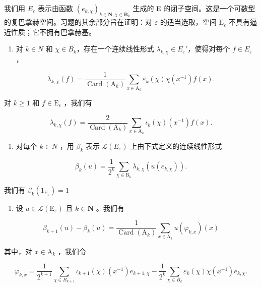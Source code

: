 我们用 \(E_{\varepsilon}\) 表示由函数 \((e_{k,\chi})_{k\in\mathbf{N},\chi\in\mathbf{B}_{k}}\) 生成的 E 的闭子空间。这是一个可数型的复巴拿赫空间。习题的其余部分旨在证明：对 \(\varepsilon\) 的适当选取，空间 \(\mathrm{E}_{\varepsilon}\) 不具有逼近性质；它不拥有巴拿赫基。

\begin{enumerate}
\def\labelenumi{\alph{enumi})}
\setcounter{enumi}{2}
\tightlist
\item
  对 \(k \in N\) 和 \(\chi \in B_{k}\)，存在一个连续线性形式 \(\lambda_{k,\chi} \in E_{\varepsilon}'\)，使得对每个 \(f \in E_{\varepsilon}\)，
\end{enumerate}

\[
\lambda_ {k, \chi} (f) = \frac {1}{\operatorname{Card} (\mathrm{A} _ {k})} \sum_ {x \in \mathrm{A} _ {k}} \varepsilon_ {k} (\chi) \chi (x ^ {- 1}) f (x).
\]

对 \(k \geqslant 1\) 和 \(f \in \mathrm{E}_{\varepsilon}\) ，我们有

\[
\lambda_ {k, \chi} (f) = \frac {2}{\operatorname{Card} (\mathrm{A} _ {k})} \sum_ {x \in \mathrm{A} _ {k}} \iota_ {k} (\chi) (x ^ {- 1}) f (x).
\]

\begin{enumerate}
\def\labelenumi{\alph{enumi})}
\setcounter{enumi}{3}
\tightlist
\item
  对每个 \(k \in N\) ，用 \(\beta_{k}\) 表示 \(\mathcal{L}(E_{\varepsilon})\) 上由下式定义的连续线性形式
\end{enumerate}

\[
\beta_ {k} (u) = \frac {1}{2 ^ {k}} \sum_ {\chi \in \mathrm{B} _ {k}} \lambda_ {k, \chi} (u (e _ {k, \chi})).
\]

我们有 \(\beta_{k}(1_{\mathrm{E}_{\varepsilon}}) = 1\)

\begin{enumerate}
\def\labelenumi{\alph{enumi})}
\setcounter{enumi}{4}
\tightlist
\item
  设 \(u \in \mathcal{L}(\mathrm{E}_{\varepsilon})\) 且 \(k \in \mathbf{N}\) 。我们有
\end{enumerate}

\[
\beta_ {k + 1} (u) - \beta_ {k} (u) = \frac {1}{\operatorname{Card} \left(\mathrm{A} _ {k}\right)} \sum_ {x \in \mathrm{A} _ {k}} u \left(\varphi_ {k, x}\right) (x)
\]

其中，对 \(x \in \mathrm{A}_k\) ，我们令

\[
\varphi_ {k, x} = \frac {1}{2 ^ {k + 1}} \sum_ {\chi \in B _ {k + 1}} \iota_ {k + 1} (\chi) (x ^ {- 1}) e _ {k + 1, \chi} - \frac {1}{2 ^ {k}} \sum_ {\chi \in B _ {k}} \varepsilon_ {k} (\chi) \chi (x ^ {- 1}) e _ {k, \chi}.
\]

